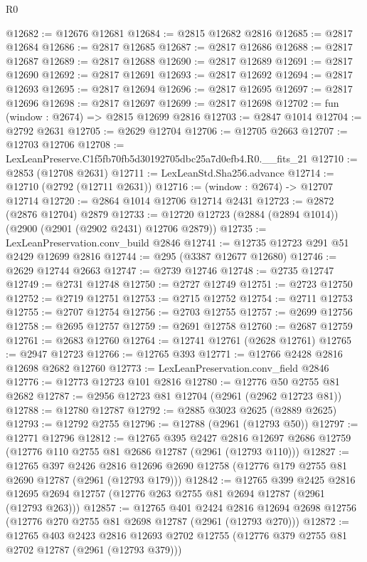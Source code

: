 \begin{lexlean}{R0}
\begin{coremodule}
@12682 := @12676 @12681
@12684 := @2815 @12682 @2816
@12685 := @2817 @12684
@12686 := @2817 @12685
@12687 := @2817 @12686
@12688 := @2817 @12687
@12689 := @2817 @12688
@12690 := @2817 @12689
@12691 := @2817 @12690
@12692 := @2817 @12691
@12693 := @2817 @12692
@12694 := @2817 @12693
@12695 := @2817 @12694
@12696 := @2817 @12695
@12697 := @2817 @12696
@12698 := @2817 @12697
@12699 := @2817 @12698
@12702 := fun (window : @2674) => @2815 @12699 @2816
@12703 := @2847 @1014
@12704 := @2792 @2631
@12705 := @2629 @12704
@12706 := @12705 @2663
@12707 := @12703 @12706
@12708 := LexLeanPreserve.C1f5fb70fb5d30192705dbc25a7d0efb4.R0.__fits_21
@12710 := @2853 (@12708 @2631)
@12711 := LexLeanStd.Sha256.advance
@12714 := @12710 (@2792 (@12711 @2631))
@12716 := (window : @2674) -> @12707 @12714
@12720 := @2864 @1014 @12706 @12714 @2431
@12723 := @2872 (@2876 @12704) @2879
@12733 := @12720 @12723 (@2884 (@2894 @1014)) (@2900 (@2901 (@2902 @2431) @12706 @2879))
@12735 := LexLeanPreservation.conv_build @2846
@12741 := @12735 @12723 @291 @51 @2429 @12699 @2816
@12744 := @295 (@3387 @12677 @12680)
@12746 := @2629 @12744 @2663
@12747 := @2739 @12746
@12748 := @2735 @12747
@12749 := @2731 @12748
@12750 := @2727 @12749
@12751 := @2723 @12750
@12752 := @2719 @12751
@12753 := @2715 @12752
@12754 := @2711 @12753
@12755 := @2707 @12754
@12756 := @2703 @12755
@12757 := @2699 @12756
@12758 := @2695 @12757
@12759 := @2691 @12758
@12760 := @2687 @12759
@12761 := @2683 @12760
@12764 := @12741 @12761 (@2628 @12761)
@12765 := @2947 @12723
@12766 := @12765 @393
@12771 := @12766 @2428 @2816 @12698 @2682 @12760
@12773 := LexLeanPreservation.conv_field @2846
@12776 := @12773 @12723 @101 @2816
@12780 := @12776 @50 @2755 @81 @2682
@12787 := @2956 @12723 @81 @12704 (@2961 (@2962 @12723 @81))
@12788 := @12780 @12787
@12792 := @2885 @3023 @2625 (@2889 @2625)
@12793 := @12792 @2755
@12796 := @12788 (@2961 (@12793 @50))
@12797 := @12771 @12796
@12812 := @12765
    @395
    @2427
    @2816
    @12697
    @2686
    @12759
    (@12776 @110 @2755 @81 @2686 @12787 (@2961 (@12793 @110)))
@12827 := @12765
    @397
    @2426
    @2816
    @12696
    @2690
    @12758
    (@12776 @179 @2755 @81 @2690 @12787 (@2961 (@12793 @179)))
@12842 := @12765
    @399
    @2425
    @2816
    @12695
    @2694
    @12757
    (@12776 @263 @2755 @81 @2694 @12787 (@2961 (@12793 @263)))
@12857 := @12765
    @401
    @2424
    @2816
    @12694
    @2698
    @12756
    (@12776 @270 @2755 @81 @2698 @12787 (@2961 (@12793 @270)))
@12872 := @12765
    @403
    @2423
    @2816
    @12693
    @2702
    @12755
    (@12776 @379 @2755 @81 @2702 @12787 (@2961 (@12793 @379)))

\end{coremodule}
\end{lexlean}
